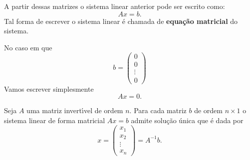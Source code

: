 A partir dessas matrizes o sistema linear anterior pode ser escrito como:
\[
    Ax = b.
\]
Tal forma de escrever o sistema linear é chamada de \textbf{equa\c{c}\~ao matricial} do sistema.

No caso em que
\[
    b = \begin{pmatrix}
        0\\0\\\vdots\\0
    \end{pmatrix}
\]
Vamos escrever simplesmente
\[
    Ax = 0.
\]

\begin{teorema}
    Seja $A$ uma matriz invert{\'\i}vel de ordem $n$. Para cada matriz $b$ de ordem $n\times 1$ o sistema linear de forma matricial $Ax = b$ admite solu\c{c}\~ao \'unica que \'e dada por
    \[
        x = \begin{pmatrix}
            x_1 \\ x_2 \\ \vdots \\ x_n
        \end{pmatrix} = A^{-1}b.
    \]
\end{teorema}

